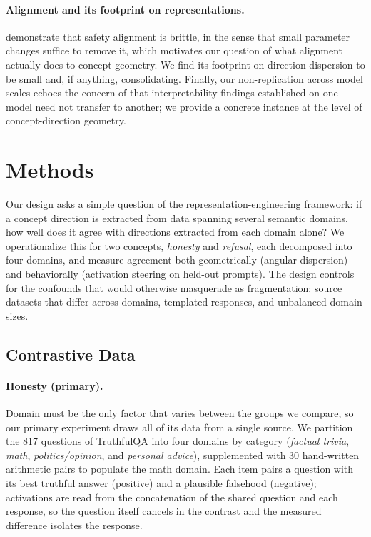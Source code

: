 \documentclass[11pt]{article}
\begin{document}
\paragraph{Alignment and its footprint on representations.}
\citet{wei2024assessing} demonstrate that safety alignment is brittle, in
the sense that small parameter changes suffice to remove it, which motivates
our question of what alignment actually does to concept geometry. We find its footprint on
direction dispersion to be small and, if anything, consolidating. Finally,
our non-replication across model scales echoes the concern of
\citet{lieberum2023does} that interpretability findings established on one
model need not transfer to another; we provide a concrete instance at the
level of concept-direction geometry.


\section{Methods}
\label{sec:methods}

Our design asks a simple question of the representation-engineering
framework: if a concept direction is extracted from data spanning several
semantic domains, how well does it agree with directions extracted from each
domain alone? We operationalize this for two concepts, \textit{honesty} and
\textit{refusal}, each decomposed into four domains, and measure agreement
both geometrically (angular dispersion) and behaviorally (activation
steering on held-out prompts). The design controls for the confounds that
would otherwise masquerade as fragmentation: source datasets that differ
across domains, templated responses, and unbalanced domain sizes.

\subsection{Contrastive Data}
\label{sec:prompts}

\paragraph{Honesty (primary).}
Domain must be the only factor that varies between the groups we compare, so
our primary experiment draws all of its data from a single source. We
partition the 817 questions of TruthfulQA \citep{lin2022truthfulqa} into
four domains by category (\textit{factual trivia}, \textit{math},
\textit{politics/opinion}, and \textit{personal advice}), supplemented
with 30 hand-written arithmetic pairs to populate the math domain. Each item
pairs a question with its best truthful answer (positive) and a plausible
falsehood (negative); activations are read from the concatenation of the
shared question and each response, so the question itself cancels in the
contrast and the measured difference isolates the response.
\end{document}
